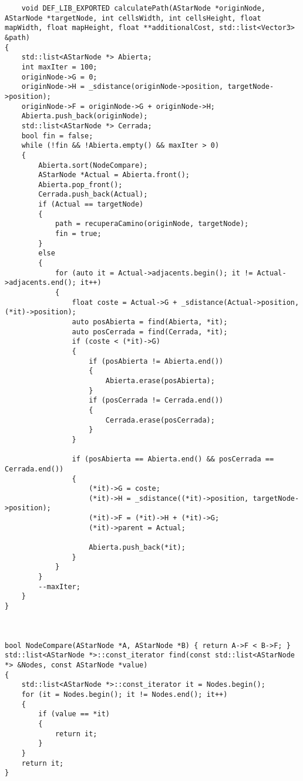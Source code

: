 \begin{lstlisting}
    void DEF_LIB_EXPORTED calculatePath(AStarNode *originNode, AStarNode *targetNode, int cellsWidth, int cellsHeight, float mapWidth, float mapHeight, float **additionalCost, std::list<Vector3> &path)
{
    std::list<AStarNode *> Abierta;
    int maxIter = 100;
    originNode->G = 0;
    originNode->H = _sdistance(originNode->position, targetNode->position);
    originNode->F = originNode->G + originNode->H;
    Abierta.push_back(originNode);
    std::list<AStarNode *> Cerrada;
    bool fin = false;
    while (!fin && !Abierta.empty() && maxIter > 0)
    {
        Abierta.sort(NodeCompare);
        AStarNode *Actual = Abierta.front();
        Abierta.pop_front();
        Cerrada.push_back(Actual);
        if (Actual == targetNode)
        {
            path = recuperaCamino(originNode, targetNode);
            fin = true;
        }
        else
        {
            for (auto it = Actual->adjacents.begin(); it != Actual->adjacents.end(); it++)
            {
                float coste = Actual->G + _sdistance(Actual->position, (*it)->position);
                auto posAbierta = find(Abierta, *it);
                auto posCerrada = find(Cerrada, *it);
                if (coste < (*it)->G)
                {
                    if (posAbierta != Abierta.end())
                    {
                        Abierta.erase(posAbierta);
                    }
                    if (posCerrada != Cerrada.end())
                    {
                        Cerrada.erase(posCerrada);
                    }
                }

                if (posAbierta == Abierta.end() && posCerrada == Cerrada.end())
                {
                    (*it)->G = coste;
                    (*it)->H = _sdistance((*it)->position, targetNode->position);
                    (*it)->F = (*it)->H + (*it)->G;
                    (*it)->parent = Actual;

                    Abierta.push_back(*it);
                }
            }
        }
        --maxIter;
    }
}



bool NodeCompare(AStarNode *A, AStarNode *B) { return A->F < B->F; }
std::list<AStarNode *>::const_iterator find(const std::list<AStarNode *> &Nodes, const AStarNode *value)
{
    std::list<AStarNode *>::const_iterator it = Nodes.begin();
    for (it = Nodes.begin(); it != Nodes.end(); it++)
    {
        if (value == *it)
        {
            return it;
        }
    }
    return it;
}
\end{lstlisting}